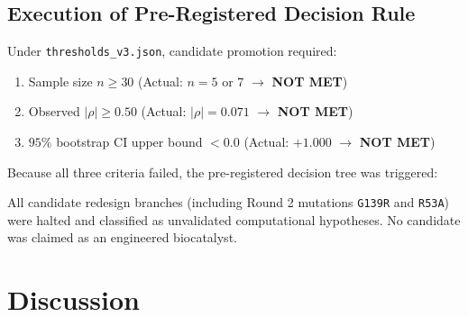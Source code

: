 \documentclass[11pt,a4paper]{article}
\begin{document}
\subsection{Execution of Pre-Registered Decision Rule}
Under \texttt{thresholds\_v3.json}, candidate promotion required:
\begin{enumerate}
    \item Sample size $n \geq 30$ (Actual: $n = 5$ or $7$ $\rightarrow$ \textbf{NOT MET})
    \item Observed $|\rho| \geq 0.50$ (Actual: $|\rho| = 0.071$ $\rightarrow$ \textbf{NOT MET})
    \item $95\%$ bootstrap CI upper bound $< 0.0$ (Actual: $+1.000$ $\rightarrow$ \textbf{NOT MET})
\end{enumerate}
Because all three criteria failed, the pre-registered decision tree was triggered:
\begin{center}
\end{center}
All candidate redesign branches (including Round 2 mutations \texttt{G139R} and \texttt{R53A}) were halted and classified as unvalidated computational hypotheses. No candidate was claimed as an engineered biocatalyst.

\section{Discussion}
\end{document}
